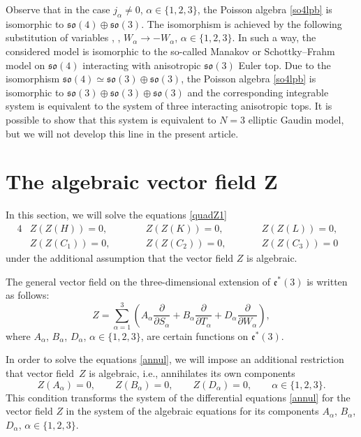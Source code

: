 \documentclass[pdftex]{sigma}
\def\a{\alpha}
\def\b{\beta}
\def\g{\gamma}
\numberwithin{equation}{section}
\begin{document}
\begin{Remark}
 Observe that in the case $j_{\a}\neq 0$, $\a\in \{1,2, 3\}$, the Poisson algebra \eqref{so4lpb} is isomorphic to $\mathfrak{so}(4)\oplus \mathfrak{so}(3)$. The isomorphism is achieved by the following substitution of variables
\smash{$S_{\a}\rightarrow \sqrt{j_{\b}} \sqrt{j_{\g}} S_{\a}$}, \smash{$ T_{\a}\rightarrow \sqrt{j_{\a}} T_{\a}$}, $ W_{\a}\rightarrow - W_{\a}$, $ \a\in \{1,2,3\}$.
In such a way, the considered model is isomorphic to the so-called Manakov or Schottky--Frahm model on $\mathfrak{so}(4)$ interacting with anisotropic $\mathfrak{so}(3)$ Euler top.
Due to the isomorphism $\mathfrak{so}(4)\simeq \mathfrak{so}(3)\oplus \mathfrak{so}(3)$, the Poisson algebra \eqref{so4lpb} is isomorphic to $\mathfrak{so}(3)\oplus \mathfrak{so}(3)\oplus \mathfrak{so}(3)$ and the corresponding integrable system is equivalent to the system of three interacting anisotropic tops. It is possible to show that this system is equivalent to $N=3$ elliptic Gaudin model, but we will not develop this line in the present article.
\end{Remark}



\section[The algebraic vector field Z]{The algebraic vector field $\boldsymbol{Z}$}\label{sec4}
In this section, we will solve the equations
\eqref{quadZ1}
\begin{alignat}{4}
&Z(Z(H))=0,\qquad &&Z(Z(K))=0, \qquad&& Z(Z(L))=0,&\nonumber\\ &Z(Z(C_1))=0, \qquad&& Z(Z(C_2))=0, \qquad&& Z(Z(C_3))=0&\label{annul}
\end{alignat}
under the additional assumption that the vector field $Z$ is algebraic.


The general vector field on the three-dimensional extension of $\mathfrak{e}^*(3)$ is written as follows:
\[
Z=\sum\limits_{\a=1}^3\left( A_{\a}\frac{\partial}{ \partial S_{\a}}+
B_{\a}\frac{\partial}{ \partial T_{\a}}+ D_{\a}\frac{\partial}{ \partial W_{\a}}\right),
\]
where $A_{\a}$, $B_{\a}$, $D_{\a}$, $\a\in \{1,2,3\}$, are certain
functions on $\mathfrak{e}^*(3)$.

In order to solve the equations \eqref{annul}, we will impose
 an additional restriction that vector field~$Z$ is algebraic, i.e., annihilates its own components
\begin{equation}\label{ZAB}
Z(A_{\a})=0, \qquad Z(B_{\a})=0, \qquad Z(D_{\a})=0, \qquad \a\in \{1,2,3\}.
\end{equation}
This condition transforms the system of the differential equations \eqref{annul}
for the vector field $Z$ in the system of the
algebraic equations for its components $A_{\a}$, $B_{\a}$, $D_{\a}$, $\a\in \{1,2,3\}$.
\end{document}
